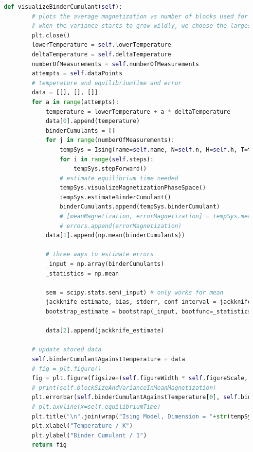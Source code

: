 \documentclass[%
showkeys,
bibnotes,
amsmath,amssymb,
floatfix,
]{revtex4-1}
\begin{document}
\begin{lstlisting}[language=Python]
    def visualizeBinderCumulant(self):
        # plots the average magnetization vs number of blocks used for measurement
        # when the variance starts to grow wildly, we choose the largest block size with non-diverging error as our correlation length (or time)
        plt.close()
        lowerTemperature = self.lowerTemperature
        deltaTemperature = self.deltaTemperature
        numberOfMeasurements = self.numberOfMeasurements
        attempts = self.dataPoints
        # temperature and equilibriumTime and error
        data = [[], [], []]
        for a in range(attempts):
            temperature = lowerTemperature + a * deltaTemperature
            data[0].append(temperature)
            binderCumulants = []
            for j in range(numberOfMeasurements):
                tempSys = Ising(name=self.name, N=self.n, H=self.h, T=temperature, D=self.d, J=self.j, randomFill=self.randomFill, K=self.k, M=self.m, equilibriumTime=self.equilibriumTime)
                for i in range(self.steps):
                    tempSys.stepForward()
                # estimate equilibrium time needed
                tempSys.visualizeMagnetizationPhaseSpace()
                tempSys.estimateBinderCumulant()
                binderCumulants.append(tempSys.binderCumulant)
                # [meanMagnetization, errorMagnetization] = tempSys.meanStationaryMagnetization()
                # errors.append(errorMagnetization)
            data[1].append(np.mean(binderCumulants))
            
            # three ways to estimate errors
            _input = np.array(binderCumulants)
            _statistics = np.mean
            
            sem = scipy.stats.sem(_input) # only works for mean
            jackknife_estimate, bias, stderr, conf_interval = jackknife_stats(np.array(_input), _statistics, 0.682)
            bootstrap_estimate = bootstrap(_input, bootfunc=_statistics)
            
            data[2].append(jackknife_estimate)
            
        # update stored data
        self.binderCumulantAgainstTemperature = data
        # fig = plt.figure()
        fig = plt.figure(figsize=(self.figureWidth * self.figureScale, self.figureHeight * self.figureScale), dpi=self.figureDpi)
        # print(self.blockSizeAndVarianceInMeanMagnetization)
        plt.errorbar(self.binderCumulantAgainstTemperature[0], self.binderCumulantAgainstTemperature[1], yerr=self.binderCumulantAgainstTemperature[2], fmt="+k")
        # plt.axvline(x=self.equilibriumTime)
        plt.title("\n".join(wrap("Ising Model, Dimension = "+str(tempSys.d)+", N = "+str(tempSys.n)+", Tc = "+str(sigfig.round(float(tempSys.tc), sigfigs=4))+"K, Time = "+str(tempSys.timeStep)+"a.u.", 60)))
        plt.xlabel("Temperature / K")
        plt.ylabel("Binder Cumulant / 1")
        return fig




\end{lstlisting}
\end{document}
